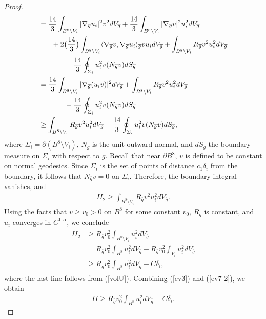 \documentclass{amsart}
\theoremstyle{definition}
\theoremstyle{remark}
\numberwithin{equation}{section}
\begin{document}
\begin{proof}
\begin{align*}
&= \frac{14}{3} \int_{B^8 \setminus V_i} |\nabla_{\overline{g}} u_i |^2 v^2 dV_{\overline{g}} +  \frac{14}{3} \int_{B^8 \setminus V_i} |\nabla_{\overline{g}} v|^2 u_i^2 dV_{\overline{g}} \\
 & \hskip.25in + 2 \big( \frac{14}{3}\big) \int_{B^8 \setminus V_i} \langle \nabla_{\overline{g}} v, \nabla_{\overline{g}} u_i \rangle_{\overline{g}} v u_i  dV_{\overline{g}} + \int_{B^8 \setminus V_i} R_{\overline{g}} v^2  u_i^2 dV_{\overline{g}} \\
 & \hskip.5in - \frac{14}{3} \oint_{\Sigma_i } u_i^2 v ( N_{\overline{g}}v)  dS_{\overline{g}} \\
 &= \frac{14}{3} \int_{B^8 \setminus V_i} |\nabla_{\overline{g}} (u_i v) |^2 dV_{\overline{g}}  + \int_{B^8 \setminus V_i} R_{\overline{g}} v^2  u_i^2 dV_{\overline{g}} \\
 & \hskip.5in - \frac{14}{3} \oint_{\Sigma_i } u_i^2 v ( N_{\overline{g}}v)  dS_{\overline{g}} \\
 &\geq \int_{B^8 \setminus V_i} R_{\overline{g}} v^2  u_i^2 dV_{\overline{g}} - \frac{14}{3} \oint_{\Sigma_i } u_i^2 v ( N_{\overline{g}}v)  dS_{\overline{g}},
\end{align*}
where $\Sigma_i = \partial (B^8 \setminus V_i)$, $N_{\overline{g}}$ is the unit outward normal, and $dS_{\overline{g}}$ the boundary measure on $\Sigma_i$ with respect to $\overline{g}$.
Recall that near $\partial B^8$, $v$ is defined to be constant on normal geodesics.  Since $\Sigma_i$ is the set of points of distance $c_1 \delta_i$ from the boundary, it follows that $N_{\overline{g}} v = 0$ on $\Sigma_i$.  Therefore, the boundary integral vanishes, and
\begin{align*} %
II_2 \geq  \int_{B^8 \setminus V_i} R_{\overline{g}} v^2  u_i^2 dV_{\overline{g}}.
\end{align*}
Using the facts that $v \geq v_0 > 0$ on $B^8$ for some constant $v_0$, $R_{\overline{g}}$ is constant, and $u_i$ converges in $C^{1,\alpha}$, we conclude
\begin{align} \label{ev7-2} \begin{split}
II_2 &\geq  R_{\overline{g}} v_0^2\int_{B^8 \setminus V_i}  u_i^2 dV_{\overline{g}} \\
&= R_{\overline{g}} v_0^2\int_{B^8} u_i^2 dV_{\overline{g}} - R_{\overline{g}} v_0^2\int_{V_i} u_i^2 dV_{\overline{g}} \\
&\geq R_{\overline{g}} v_0^2\int_{B^8} u_i^2 dV_{\overline{g}} - C \delta_i,
\end{split}
\end{align}
where the last line follows from (\ref{volU}). %
Combining %
(\ref{ev3}) and (\ref{ev7-2}), we obtain
\begin{align} \label{II}
II \geq  R_{\overline{g}} v_0^2\int_{B^8} u_i^2 dV_{\overline{g}}  - C \delta_i.
\end{align}


\end{proof}
\end{document}
